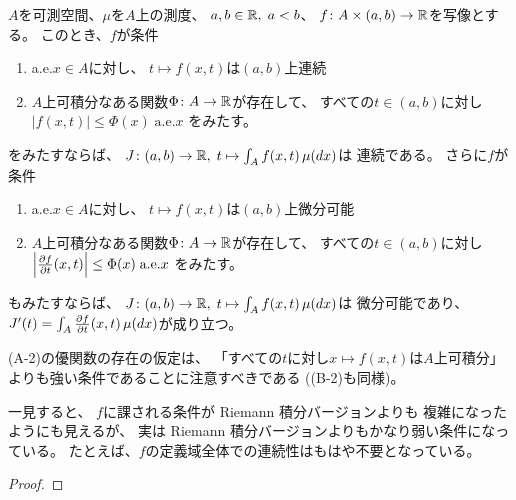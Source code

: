 \documentclass[report]{jlreq}
\begin{document}
\begin{theorem}
    $A$を可測空間、$\mu$を$A$上の測度、
    $a, b \in \mathbb{R}, \; a < b$、
    $f \colon A \times (a, b) \to \mathbb{R}$を写像とする。
    このとき、$f$が条件
    \begin{enumerate}[label=(A-\arabic*)]
        \item a.e.$x \in A$に対し、
            $t \mapsto f(x, t)$は$(a, b)$上連続
        \item $A$上可積分なある関数$\Phi \colon A \to \mathbb{R}$が存在して、
            すべての$t \in (a, b)$に対し
            $|f(x, t)| \le \Phi(x) \; \text{a.e.$x$}$
            をみたす。
    \end{enumerate}
    をみたすならば、
    $J \colon (a, b) \to \mathbb{R}, \; t \mapsto \int_A f(x, t) \, \mu(dx)$は
    連続である。
    さらに$f$が条件
    \begin{enumerate}[label=(B-\arabic*)]
        \item a.e.$x \in A$に対し、
            $t \mapsto f(x, t)$は$(a, b)$上微分可能
        \item $A$上可積分なある関数$\Phi \colon A \to \mathbb{R}$が存在して、
            すべての$t \in (a, b)$に対し
            $\left|\deldel[f]{t}(x, t)\right| \le \Phi(x) \; \text{a.e.$x$}$
            をみたす。
    \end{enumerate}
    もみたすならば、
    $J \colon (a, b) \to \mathbb{R}, \; t \mapsto \int_A f(x, t) \, \mu(dx)$は
    微分可能であり、
    $J'(t) = \int_A \deldel[f]{t}(x, t) \, \mu(dx)$が成り立つ。
\end{theorem}

\begin{remark}
    (A-2)の優関数の存在の仮定は、
    「すべての$t$に対し$x \mapsto f(x, t)$は$A$上可積分」
    よりも強い条件であることに注意すべきである
    ((B-2)も同様)。

    一見すると、
    $f$に課される条件が Riemann 積分バージョンよりも
    複雑になったようにも見えるが、
    実は Riemann 積分バージョンよりもかなり弱い条件になっている。
    たとえば、$f$の定義域全体での連続性はもはや不要となっている。

\end{remark}

\begin{proof}
    \TODO{}
\end{proof}
\end{document}
